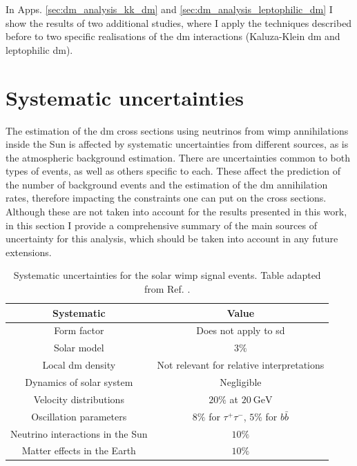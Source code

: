 In Apps. \ref{sec:dm_analysis_kk_dm} and \ref{sec:dm_analysis_leptophilic_dm} I show the results of two additional studies, where I apply the techniques described before to two specific realisations of the \gls{dm} interactions (Kaluza-Klein \gls{dm} and leptophilic \gls{dm}).

\section{Systematic uncertainties}
\label{sec:dm_analysis_systematics}

The estimation of the \gls{dm} cross sections using neutrinos from \gls{wimp} annihilations inside the Sun is affected by systematic uncertainties from different sources, as is the atmospheric background estimation. There are uncertainties common to both types of events, as well as others specific to each. These affect the prediction of the number of background events and the estimation of the \gls{dm} annihilation rates, therefore impacting the constraints one can put on the cross sections. Although these are not taken into account for the results presented in this work, in this section I provide a comprehensive summary of the main sources of uncertainty for this analysis, which should be taken into account in any future extensions.

\begin{table}[t]
	\caption[Systematic uncertainties for the solar \gls{wimp} signal events.]{Systematic uncertainties for the solar \gls{wimp} signal events. Table adapted from Ref. \cite{Principato2021}.}
	\begin{center}
		\begin{small}
			\begin{tabular}{c|c}
				Systematic                         & Value \\[2mm] \hline
				\rule{0pt}{1.1\normalbaselineskip}Form factor                      & Does not apply to \gls{sd} \cite{Wikstroem2009} \\[2mm]
				Solar model                      & $3\%$ \cite{Wikstroem2009} \\[2mm]
				Local \gls{dm} density                 & Not relevant for relative interpretations \cite{Wikstroem2009,Super-Kamiokande2015} \\[2mm]
				Dynamics of solar system         & Negligible \cite{Rott2011} \\[2mm]
				Velocity distributions           & $20\%$ at $20~\mathrm{GeV}$ \cite{Wikstroem2009,Super-Kamiokande2015} \\[2mm] \hline
				\rule{0pt}{1.1\normalbaselineskip}Oscillation parameters           & $8\%$ for $\tau^{+}\tau^{-}$, $5\%$ for $b\bar{b}$ \cite{Boliev2013} \\[2mm]
				Neutrino interactions in the Sun & $10\%$ \\[2mm]
				Matter effects in the Earth      & $10\%$ 
			\end{tabular}
		\end{small}
	\end{center}
	\label{tab:solar_dm_signal_uncertainties}
\end{table}

